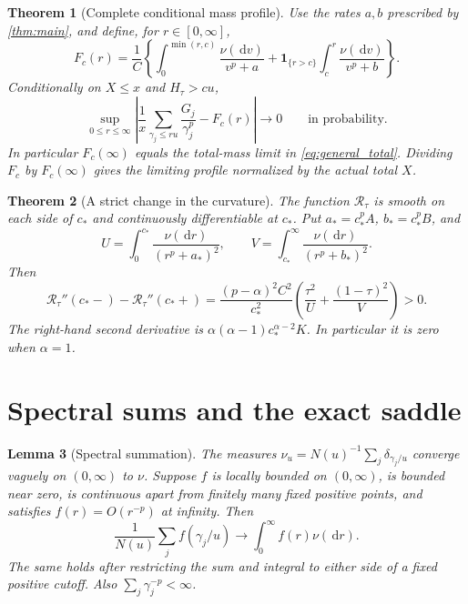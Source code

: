 \documentclass[11pt,letterpaper]{article}
\numberwithin{equation}{section}
\newtheorem{theorem}{Theorem}[section]
\newtheorem{lemma}[theorem]{Lemma}
\theoremstyle{definition}
\theoremstyle{remark}
\newcommand{\dd}{\,\mathrm d}
\newcommand{\ind}{\mathbf 1}
\newcommand{\rate}{\mathcal R_\tau}
\begin{document}
\begin{theorem}[Complete conditional mass profile]\label{thm:profile}
Use the rates $a,b$ prescribed by \cref{thm:main}, and define, for $r\in[0,\infty]$,
\begin{equation}\label{eq:profile}
 F_c(r)=\frac1C\left\{
 \int_0^{\min(r,c)}\frac{\nu(\dd v)}{v^p+a}
 +\ind_{\{r>c\}}\int_c^r\frac{\nu(\dd v)}{v^p+b}\right\}.
\end{equation}
Conditionally on $X\le x$ and $H_\tau>cu$,
\begin{equation}\label{eq:uniform_profile}
 \sup_{0\le r\le\infty}
 \left|\frac1x\sum_{\gamma_j\le ru}\frac{G_j}{\gamma_j^p}-F_c(r)\right|
 \longrightarrow0
 \qquad\text{in probability.}
\end{equation}
In particular $F_c(\infty)$ equals the total-mass limit in \cref{eq:general_total}. Dividing $F_c$ by $F_c(\infty)$ gives the limiting profile normalized by the actual total $X$.
\end{theorem}

\begin{theorem}[A strict change in the curvature]\label{thm:curvature}
The function $\rate$ is smooth on each side of $c_*$ and continuously differentiable at $c_*$. Put $a_*=c_*^p A$, $b_*=c_*^p B$, and
\begin{equation}\label{eq:UV}
 U=\int_0^{c_*}\frac{\nu(\dd r)}{(r^p+a_*)^2},\qquad
 V=\int_{c_*}^\infty\frac{\nu(\dd r)}{(r^p+b_*)^2}.
\end{equation}
Then
\begin{equation}\label{eq:jump}
 \boxed{\rate''(c_*-)-\rate''(c_*+)
 =\frac{(p-\alpha)^2C^2}{c_*^2}
 \left(\frac{\tau^2}{U}+\frac{(1-\tau)^2}{V}\right)>0.}
\end{equation}
The right-hand second derivative is $\alpha(\alpha-1)c_*^{\alpha-2}K$. In particular it is zero when $\alpha=1$.
\end{theorem}

\section{Spectral sums and the exact saddle}\label{sec:sums}

\begin{lemma}[Spectral summation]\label{lem:sums}
The measures $\nu_u=N(u)^{-1}\sum_j\delta_{\gamma_j/u}$ converge vaguely on $(0,\infty)$ to $\nu$. Suppose $f$ is locally bounded on $(0,\infty)$, is bounded near zero, is continuous apart from finitely many fixed positive points, and satisfies $f(r)=O(r^{-p})$ at infinity. Then
\begin{equation}\label{eq:sum_limit}
 \frac1{N(u)}\sum_j f(\gamma_j/u)
 \longrightarrow\int_0^\infty f(r)\nu(\dd r).
\end{equation}
The same holds after restricting the sum and integral to either side of a fixed positive cutoff. Also $\sum_j\gamma_j^{-p}<\infty$.
\end{lemma}
\end{document}
